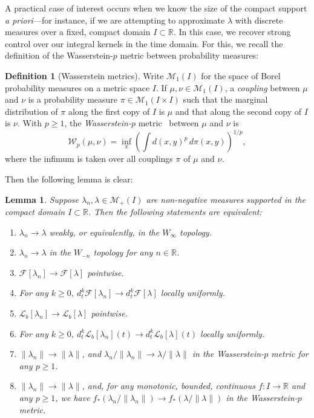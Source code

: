 \documentclass{cams-l} %
\newcommand{\RR}{\mathbb R}
\newcommand{\cL}{\mathcal L}
\newcommand{\cM}{\mathcal M}
\newcommand{\cF}{\mathcal F}
\newtheorem{lemma}[theorem]{Lemma}
\theoremstyle{definition}
\newtheorem{definition}[theorem]{Definition}
\theoremstyle{remark}
\numberwithin{equation}{section}
\begin{document}
A practical case of interest occurs when we know the size of the compact support \emph{a priori}---for instance, if we are attempting to approximate $\lambda$ with discrete measures over a fixed, compact domain $I\subset\RR$. In this case, we recover strong control over our integral kernels in the time domain. For this, we recall the definition of the Wasserstein-$p$ metric between probability measures:
\begin{definition}[Wasserstein metrics]\label{def:wasserstein_metric}
    Write $\cM_1(I)$ for the space of Borel probability measures on a metric space $I$. If $\mu, \nu \in \cM_1(I)$, a \emph{coupling} between $\mu$ and $\nu$ is a probability measure $\pi \in \cM_1(I\times I)$ such that the marginal distribution of $\pi$ along the first copy of $I$ is $\mu$ and that along the second copy of $I$ is $\nu$. With $p \geq 1$, the \emph{Wasserstein-$p$} metric~\cite{santambrogio2015optimal} between $\mu$ and $\nu$ is
    \[\mathcal{W}_p(\mu, \nu) = \inf_\pi\left(\int d(x,y)^p\,d\pi(x,y)\right)^{1/p},\]
    where the infimum is taken over all couplings $\pi$ of $\mu$ and $\nu$.
\end{definition}


Then the following lemma is clear:
\begin{lemma}\label{lem:time_cont_infty}
    Suppose $\lambda_n,\lambda\in\cM_+(I)$ are non-negative measures supported in the compact domain $I\subset\RR$. Then the following statements are equivalent:
    \begin{enumerate}
        \item $\lambda_n\to\lambda$ weakly, or equivalently, in the $W_{\infty}$ topology.
        \item $\lambda_n\to\lambda$ in the $W_{-n}$ topology for any $n\in\RR$.
        \item $\cF[\lambda_n]\to\cF[\lambda]$ pointwise.
        \item For any $k\geq 0$, $d_t^k\cF[\lambda_n]\to d_t^k\cF[\lambda]$ locally uniformly.
        \item $\cL_b[\lambda_n]\to\cL_b[\lambda]$ pointwise.
        \item For any $k\geq 0$, $d_t^k\cL_b[\lambda_n](t)\to d_t^k\cL_b[\lambda](t)$ locally uniformly.
        \item $\|\lambda_n\|\to\|\lambda\|$, and $\lambda_n/\|\lambda_n\|\to\lambda/\|\lambda\|$ in the Wasserstein-$p$ metric for any $p\geq 1$.
        \item $\|\lambda_n\|\to\|\lambda\|$, and, for any monotonic, bounded, continuous $f:I\to\RR$ and any $p\geq 1$, we have $f_*(\lambda_n/\|\lambda_n\|)\to f_*(\lambda/\|\lambda\|)$ in the Wasserstein-$p$ metric.
    \end{enumerate}
\end{lemma}
\end{document}
